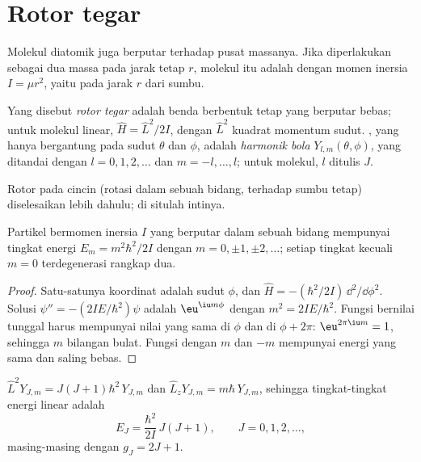 \section{Rotor tegar}

Molekul diatomik juga berputar terhadap pusat massanya. Jika diperlakukan
sebagai dua massa pada jarak tetap $r$, molekul itu adalah 
dengan momen inersia $I = \mu r^2$, yaitu  pada jarak $r$
dari sumbu.

\begin{definition}\label{def:b3:quantum-model-systems:rotor}
Yang disebut \emph{rotor tegar} adalah benda berbentuk
tetap yang berputar bebas; untuk molekul linear, $\hat H = \hat L^2/2I$, dengan
$\hat L^2$  kuadrat momentum sudut. , yang
hanya bergantung pada sudut $\theta$ dan $\phi$, adalah \emph{harmonik
bola} $Y_{l,m}(\theta,\phi)$, yang ditandai dengan $l =
0, 1, 2, \dots$ dan $m = -l, \dots, l$; untuk molekul, $l$ ditulis $J$.
\end{definition}

Rotor pada cincin (rotasi dalam sebuah bidang, terhadap sumbu tetap)
diselesaikan lebih dahulu; di situlah intinya.

\begin{theorem}[Cincin]\label{thm:b3:quantum-model-systems:ring}
Partikel bermomen inersia $I$ yang berputar dalam sebuah bidang mempunyai
tingkat energi $E_m = m^2\hbar^2/2I$ dengan $m = 0, \pm1, \pm2, \dots$; setiap
tingkat kecuali $m = 0$ terdegenerasi rangkap dua.
\end{theorem}

\begin{proof}
Satu-satunya koordinat adalah sudut $\phi$, dan $\hat H = -(\hbar^2/2I)\,
\dd^2/\dd\phi^2$. Solusi $\psi'' = -(2IE/\hbar^2)\psi$ adalah $\eu^{\iu
m\phi}$ dengan $m^2 = 2IE/\hbar^2$. Fungsi bernilai tunggal harus mempunyai
nilai yang sama di $\phi$ dan di $\phi + 2\pi$: $\eu^{2\pi\iu m} = 1$, sehingga
$m$ bilangan bulat. Fungsi dengan $m$ dan $-m$ mempunyai energi yang sama dan
saling bebas.
\end{proof}

\begin{theorem}\label{thm:b3:quantum-model-systems:rotor}
$\hat L^2Y_{J,m} = J(J+1)\hbar^2\,Y_{J,m}$ dan $\hat L_zY_{J,m} = m\hbar\,
Y_{J,m}$, sehingga tingkat-tingkat energi  linear adalah
\[
E_J = \frac{\hbar^2}{2I}\,J(J+1), \qquad J = 0, 1, 2, \dots,
\]
masing-masing dengan  $g_J = 2J + 1$.
\end{theorem}
\admitted


